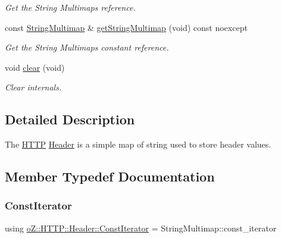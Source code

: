 \begin{DoxyCompactItemize}
\begin{DoxyCompactList}\small\item\em Get the String Multimap\textquotesingle{}s reference. \end{DoxyCompactList}\item 
const \mbox{\hyperlink{namespaceo_z_1_1_h_t_t_p_a339aac279d709cfa16148ad073500fc1}{String\+Multimap}} \& \mbox{\hyperlink{classo_z_1_1_h_t_t_p_1_1_header_af1ee1c1e6a882a605407683341e32a8f}{get\+String\+Multimap}} (void) const noexcept
\begin{DoxyCompactList}\small\item\em Get the String Multimap\textquotesingle{}s constant reference. \end{DoxyCompactList}\item 
void \mbox{\hyperlink{classo_z_1_1_h_t_t_p_1_1_header_a1cfaa8a5de62d172e3906b296a5c7e4b}{clear}} (void)
\begin{DoxyCompactList}\small\item\em Clear internals. \end{DoxyCompactList}\end{DoxyCompactItemize}


\subsection{Detailed Description}
The \mbox{\hyperlink{namespaceo_z_1_1_h_t_t_p}{H\+T\+TP}} \mbox{\hyperlink{classo_z_1_1_h_t_t_p_1_1_header}{Header}} is a simple map of string used to store header values. 

\subsection{Member Typedef Documentation}
\mbox{\label{classo_z_1_1_h_t_t_p_1_1_header_a509c1ea8f5b221246e6e49c01a115d69}} 
\subsubsection{\texorpdfstring{ConstIterator}{ConstIterator}}
{\footnotesize\ttfamily using \mbox{\hyperlink{classo_z_1_1_h_t_t_p_1_1_header_a509c1ea8f5b221246e6e49c01a115d69}{o\+Z\+::\+H\+T\+T\+P\+::\+Header\+::\+Const\+Iterator}} =  String\+Multimap\+::const\+\_\+iterator}

